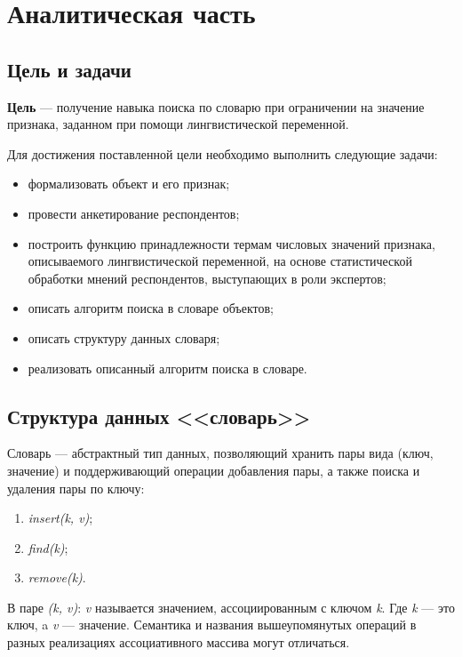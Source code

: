 \chapter{Аналитическая часть}

\section{Цель и задачи}
\textbf{Цель} --- получение навыка поиска по словарю при ограничении на значение признака, заданном при помощи лингвистической переменной.

Для достижения поставленной цели необходимо выполнить следующие задачи:

\begin{itemize}[label=---]
	\item формализовать объект и его признак;
	\item провести анкетирование респондентов;
	\item построить функцию принадлежности термам числовых значений признака, описываемого лингвистической переменной, на основе статистической обработки мнений респондентов, выступающих в роли экспертов;
	\item описать алгоритм поиска в словаре объектов;
	\item описать структуру данных словаря;
	\item реализовать описанный алгоритм поиска в словаре.
\end{itemize}

\section{Структура данных <<словарь>>}

Словарь \cite{dict} --- абстрактный тип данных, позволяющий хранить пары вида (ключ, значение) и поддерживающий операции добавления пары, а также поиска и удаления пары по ключу:
\begin{enumerate}[label=\arabic*)]
	\item \textit{insert(k, v)};
	\item \textit{find(k)};
	\item \textit{remove(k)}.
\end{enumerate}

В паре \textit{(k, v)}: \textit{v} называется значением, ассоциированным с ключом \textit{k}. Где \textit{k} — это ключ, a \textit{v} — значение. Семантика и названия вышеупомянутых операций в разных реализациях ассоциативного массива могут отличаться.

